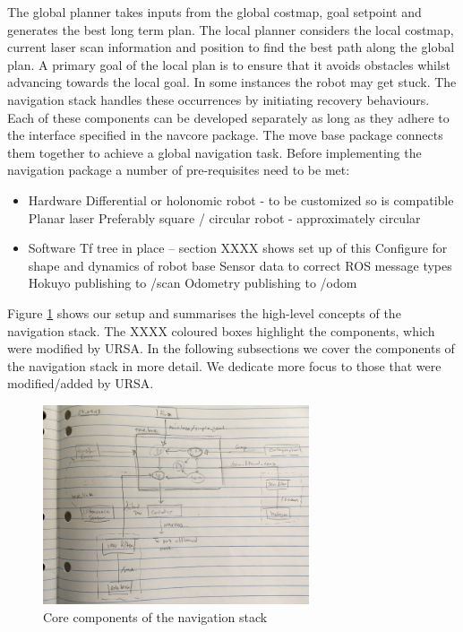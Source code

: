 \documentclass[capstone_report.tex]{subfiles}
\begin{document}
The global planner takes inputs from the global costmap, goal setpoint and generates the best long term plan.  The local planner considers the local costmap, current laser scan information and position to find the best path along the global plan.  A primary goal of the local plan is to ensure that it avoids obstacles whilst advancing towards the local goal.  In some instances the robot may get stuck.  The navigation stack handles these occurrences by initiating recovery behaviours.\\

Each of these components can be developed separately as long as they adhere to the interface specified in the navcore package.  The move base package connects them together to achieve a global navigation task.  Before implementing the navigation package a number of pre-requisites need to be met:
\begin{itemize}
\item Hardware
    \subitem Differential or holonomic robot - to be customized so is compatible
    \subitem Planar laser
    \subitem Preferably square / circular robot - approximately circular
\item Software
    \subitem Tf tree in place – section XXXX shows set up of this
    \subitem Configure for shape and dynamics of robot base
    \subitem Sensor data to correct ROS message types
        \subsubitem Hokuyo publishing to /scan
        \subsubitem Odometry publishing to /odom
\end{itemize}

Figure \ref{fig:nav_stack} shows our setup and summarises the high-level concepts of the navigation stack.  The XXXX coloured boxes highlight the components, which were modified by URSA.  In the following subsections we cover the components of the navigation stack in more detail.  We dedicate more focus to those that were modified/added by URSA.

\begin{figure}[H]
    \centering
    \includegraphics[width=0.7\textwidth]{imgs/nav_stack.jpg}
    \caption{Core components of the navigation stack\label{fig:nav_stack}}
\end{figure}
\end{document}
